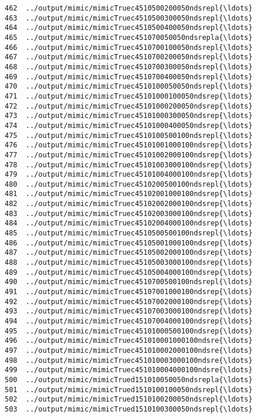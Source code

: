 \documentclass[11pt]{article}
\begin{document}
\begin{Verbatim}[commandchars=\\\{\}]
462  ../output/mimic/mimicTruec4510500200050ndsrepl{\ldots}  
463  ../output/mimic/mimicTruec4510500300050ndsrepl{\ldots}  
464  ../output/mimic/mimicTruec4510500400050ndsrepl{\ldots}  
465  ../output/mimic/mimicTruec451070050050ndsrepla{\ldots}  
466  ../output/mimic/mimicTruec4510700100050ndsrepl{\ldots}  
467  ../output/mimic/mimicTruec4510700200050ndsrepl{\ldots}  
468  ../output/mimic/mimicTruec4510700300050ndsrepl{\ldots}  
469  ../output/mimic/mimicTruec4510700400050ndsrepl{\ldots}  
470  ../output/mimic/mimicTruec4510100050050ndsrepl{\ldots}  
471  ../output/mimic/mimicTruec45101000100050ndsrep{\ldots}  
472  ../output/mimic/mimicTruec45101000200050ndsrep{\ldots}  
473  ../output/mimic/mimicTruec45101000300050ndsrep{\ldots}  
474  ../output/mimic/mimicTruec45101000400050ndsrep{\ldots}  
475  ../output/mimic/mimicTruec4510100500100ndsrepl{\ldots}  
476  ../output/mimic/mimicTruec45101001000100ndsrep{\ldots}  
477  ../output/mimic/mimicTruec45101002000100ndsrep{\ldots}  
478  ../output/mimic/mimicTruec45101003000100ndsrep{\ldots}  
479  ../output/mimic/mimicTruec45101004000100ndsrep{\ldots}  
480  ../output/mimic/mimicTruec4510200500100ndsrepl{\ldots}  
481  ../output/mimic/mimicTruec45102001000100ndsrep{\ldots}  
482  ../output/mimic/mimicTruec45102002000100ndsrep{\ldots}  
483  ../output/mimic/mimicTruec45102003000100ndsrep{\ldots}  
484  ../output/mimic/mimicTruec45102004000100ndsrep{\ldots}  
485  ../output/mimic/mimicTruec4510500500100ndsrepl{\ldots}  
486  ../output/mimic/mimicTruec45105001000100ndsrep{\ldots}  
487  ../output/mimic/mimicTruec45105002000100ndsrep{\ldots}  
488  ../output/mimic/mimicTruec45105003000100ndsrep{\ldots}  
489  ../output/mimic/mimicTruec45105004000100ndsrep{\ldots}  
490  ../output/mimic/mimicTruec4510700500100ndsrepl{\ldots}  
491  ../output/mimic/mimicTruec45107001000100ndsrep{\ldots}  
492  ../output/mimic/mimicTruec45107002000100ndsrep{\ldots}  
493  ../output/mimic/mimicTruec45107003000100ndsrep{\ldots}  
494  ../output/mimic/mimicTruec45107004000100ndsrep{\ldots}  
495  ../output/mimic/mimicTruec45101000500100ndsrep{\ldots}  
496  ../output/mimic/mimicTruec451010001000100ndsre{\ldots}  
497  ../output/mimic/mimicTruec451010002000100ndsre{\ldots}  
498  ../output/mimic/mimicTruec451010003000100ndsre{\ldots}  
499  ../output/mimic/mimicTruec451010004000100ndsre{\ldots}  
500  ../output/mimic/mimicTrued151010050050ndsrepla{\ldots}  
501  ../output/mimic/mimicTrued1510100100050ndsrepl{\ldots}  
502  ../output/mimic/mimicTrued1510100200050ndsrepl{\ldots}  
503  ../output/mimic/mimicTrued1510100300050ndsrepl{\ldots}  

\end{Verbatim}
\end{document}
